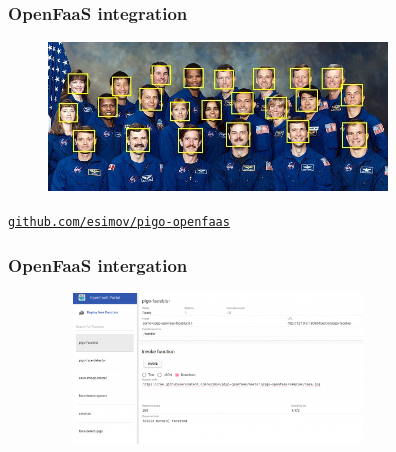 \documentclass[9pt]{beamer}
\newcommand{\myblue} [1] {{\color{blue}#1}}
\begin{document}
\begin{frame}[fragile]
\frametitle{OpenFaaS integration}


\begin{figure}[h]
\begin{center}
\includegraphics[width=9cm,height=4cm]{assets/pigo_openfaas_result.jpg}
\end{center}

\end{figure}

\myblue{\href{https://github.com/esimov/pigo-openfaas}{\texttt{github.com/esimov/pigo-openfaas}}}


\end{frame}

\begin{frame}[fragile]
\frametitle{OpenFaaS intergation}


\begin{figure}[h]
\begin{center}
\includegraphics[width=9cm,height=4cm]{assets/pigo_openfaas-blur.png}
\end{center}

\end{figure}


\end{frame}
\end{document}
